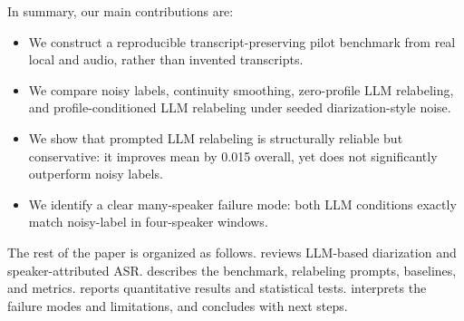 In summary, our main contributions are:
\begin{itemize}[leftmargin=*,itemsep=0pt,topsep=0pt]
    \item We construct a reproducible transcript-preserving pilot benchmark from real local \amisdm and \simsamu audio, rather than invented transcripts.
    \item We compare noisy labels, continuity smoothing, zero-profile LLM relabeling, and profile-conditioned LLM relabeling under seeded diarization-style noise.
    \item We show that prompted LLM relabeling is structurally reliable but conservative: it improves mean \wder by 0.015 overall, yet does not significantly outperform noisy labels.
    \item We identify a clear many-speaker failure mode: both LLM conditions exactly match noisy-label \wder in four-speaker \amisdm windows.
\end{itemize}

The rest of the paper is organized as follows.  reviews LLM-based diarization and speaker-attributed ASR.  describes the benchmark, relabeling prompts, baselines, and metrics.  reports quantitative results and statistical tests.  interprets the failure modes and limitations, and  concludes with next steps.

